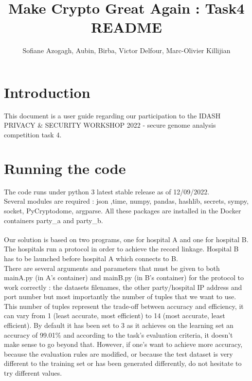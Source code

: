 \documentclass{article}
\begin{document}
\title{Make Crypto Great Again : Task4 README}
\author{Sofiane Azogagh, Aubin, Birba, Victor Delfour, Marc-Olivier Killijian}

\maketitle

\section{Introduction}
This document is a user guide regarding our participation to the IDASH PRIVACY \& SECURITY WORKSHOP 2022 - secure genome analysis competition task 4.\\

\section{Running the code}
The code runs under python 3 latest stable release as of 12/09/2022.\\
Several modules are required : json ,time, numpy, pandas, hashlib, secrets, sympy, socket, PyCryptodome, argparse. All these packages are installed in the Docker containers party\_a and party\_b. \\\\

Our solution is based on two programs, one for hospital A and one for hospital B. The hospitals run a protocol in order to achieve the record linkage. Hospital B has to be launched before hospital A which connects to B. \\

There are several arguments and parameters that must be given to both mainA.py (in A's container) and mainB.py (in B's container) for the protocol to work correctly : 
the datasets filenames, the other party/hospital IP address and port number but most importantly the number of tuples that we want to use. This number of tuples represent the trade-off between accuracy and efficiency, it can vary from 1 (least accurate, most efficient) to 14 (most accurate, least efficient). By default it has been set to 3 as it achieves on the learning set an accuracy of 99.01\% and according to the task's evaluation criteria, it doesn't make sense to go beyond that. However, if one's want to achieve more accuracy, because the evaluation rules are modified, or because the test dataset is very different to the training set or has been generated differently, do not hesitate to try different values.\\
\end{document}
